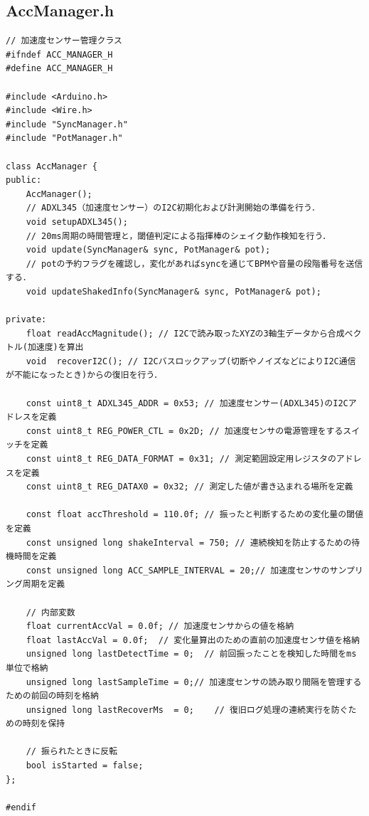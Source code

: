 \subsection{AccManager.h}
\begin{lstlisting}[caption={AccManager.h}, label={lst:siki_acc_h}]
// 加速度センサー管理クラス
#ifndef ACC_MANAGER_H
#define ACC_MANAGER_H

#include <Arduino.h>
#include <Wire.h>
#include "SyncManager.h"
#include "PotManager.h"

class AccManager {
public:
    AccManager();
    // ADXL345（加速度センサー）のI2C初期化および計測開始の準備を行う．
    void setupADXL345();  
    // 20ms周期の時間管理と，閾値判定による指揮棒のシェイク動作検知を行う．
    void update(SyncManager& sync, PotManager& pot); 
    // potの予約フラグを確認し，変化があればsyncを通じてBPMや音量の段階番号を送信する．
    void updateShakedInfo(SyncManager& sync, PotManager& pot);

private:
    float readAccMagnitude(); // I2Cで読み取ったXYZの3軸生データから合成ベクトル(加速度)を算出
    void  recoverI2C(); // I2Cバスロックアップ(切断やノイズなどによりI2C通信が不能になったとき)からの復旧を行う．

    const uint8_t ADXL345_ADDR = 0x53; // 加速度センサー(ADXL345)のI2Cアドレスを定義
    const uint8_t REG_POWER_CTL = 0x2D; // 加速度センサの電源管理をするスイッチを定義
    const uint8_t REG_DATA_FORMAT = 0x31; // 測定範囲設定用レジスタのアドレスを定義
    const uint8_t REG_DATAX0 = 0x32; // 測定した値が書き込まれる場所を定義

    const float accThreshold = 110.0f; // 振ったと判断するための変化量の閾値を定義
    const unsigned long shakeInterval = 750; // 連続検知を防止するための待機時間を定義
    const unsigned long ACC_SAMPLE_INTERVAL = 20;// 加速度センサのサンプリング周期を定義

    // 内部変数
    float currentAccVal = 0.0f; // 加速度センサからの値を格納
    float lastAccVal = 0.0f;  // 変化量算出のための直前の加速度センサ値を格納
    unsigned long lastDetectTime = 0;  // 前回振ったことを検知した時間をms単位で格納
    unsigned long lastSampleTime = 0;// 加速度センサの読み取り間隔を管理するための前回の時刻を格納
    unsigned long lastRecoverMs  = 0;    // 復旧ログ処理の連続実行を防ぐための時刻を保持

    // 振られたときに反転
    bool isStarted = false; 
};

#endif
\end{lstlisting}

